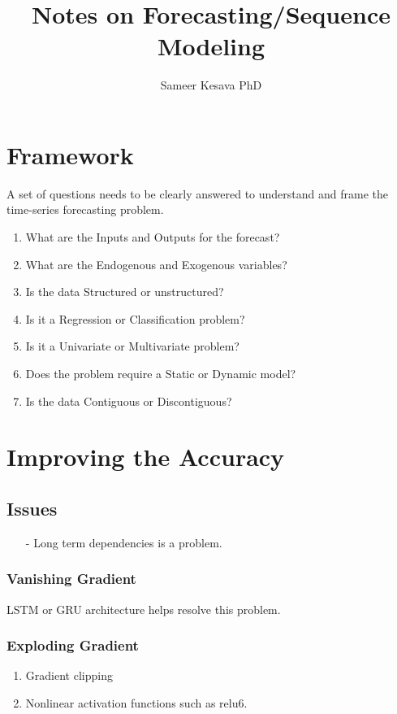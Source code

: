 \documentclass[a4paper, 12pt]{report}
\begin{document}
\title{Notes on Forecasting/Sequence Modeling}
\author{Sameer Kesava PhD}
\maketitle

\tableofcontents
\newpage



\chapter{Framework}
A set of questions needs to be clearly answered to understand and frame the time-series forecasting problem.

\begin{enumerate}
\item What are the Inputs and Outputs for the forecast?
\item What are the Endogenous and Exogenous variables?
\item Is the data Structured or unstructured?
\item Is it a Regression or Classification problem?
\item Is it a Univariate or Multivariate problem?
\item Does the problem require a Static or Dynamic model?
\item Is the data Contiguous or Discontiguous?
\end{enumerate}

\chapter{Improving the Accuracy}
\section{Issues}
\label{sec:issues}
\begin{itemize}
\item[-] Long term dependencies is a problem.
\end{itemize}

\subsection{Vanishing Gradient}
LSTM or GRU architecture helps resolve this problem.

\subsection{Exploding Gradient}
\begin{enumerate}
\item Gradient clipping
\item Nonlinear activation functions such as relu6.
\end{enumerate}
\end{document}

